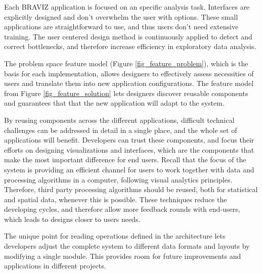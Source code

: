 Each BRAVIZ application is focused on an specific analysis task. Interfaces are explicitly designed and don't overwhelm the user with options. These small applications are straightforward to use, and thus users don't need extensive training. The user centered design method is continuously applied to detect and correct bottlenecks, and therefore increase efficiency in exploratory data analysis. 

The problem space feature model (Figure \ref{fig_feature_problem}), which is the basis for each implementation, allows designers to effectively assess necessities of users and translate them into new application configurations. The feature model from Figure \ref{fig_feature_solution} lets designers discover reusable components and guarantees that that the new application will adapt to the  system. 

By reusing components across the different applications, difficult technical challenges can be addressed in detail in a single place, and the whole set of applications will benefit. Developers can trust these components, and focus their efforts on designing visualizations and interfaces, which are the components that make the most important difference for end users. Recall that the focus of the system is providing an efficient channel for users to work together with data and processing algorithms in a computer, following visual analytics principles. Therefore, third party processing algorithms should be reused, both for statistical and spatial data, whenever this is possible. These techniques reduce the developing cycles, and therefore allow more feedback rounds with end-users, which leads to designs closer to users needs.

The unique point for reading operations defined in the architecture lets developers adjust the complete system to different data formats and layouts by modifying a single module. This provides room for future improvements and applications in different projects. 



